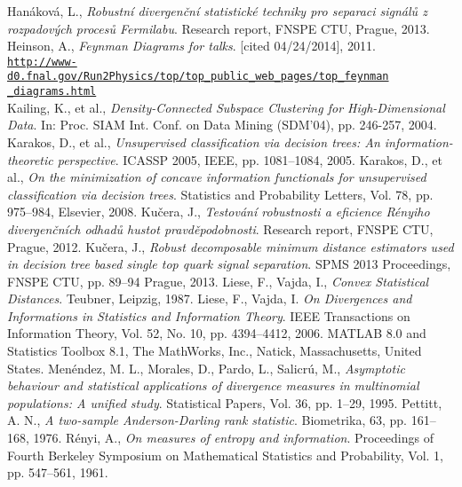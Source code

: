 \begin{thebibliography}{10}
  Han\'akov\'a, L., {\em Robustn\'i divergen\v{c}n\'i statistick\'e techniky pro separaci sign\'al\r{u} z rozpadov\'ych proces\r{u} Fermilabu}. Research report, FNSPE CTU, Prague, 2013.
Heinson, A., {\em Feynman Diagrams for talks}. [cited 04/24/2014], 2011. \\ \href{http://www-d0.fnal.gov/Run2Physics/top/top_public_web_pages/top_feynman_diagrams.html}{\texttt{http://www-d0.fnal.gov/Run2Physics/top/top\_public\_web\_pages/top\_feynman}} \\
\href{http://www-d0.fnal.gov/Run2Physics/top/top_public_web_pages/top_feynman_diagrams.html}{\texttt{\_diagrams.html}}\\
 Kailing, K., et al., {\em Density-Connected Subspace Clustering for High-Dimensional Data}. In: Proc. SIAM Int. Conf. on Data Mining (SDM'04), pp. 246-257, 2004.
 Karakos, D., et al., {\em Unsupervised classification via decision trees: An information-theoretic perspective}. ICASSP 2005, IEEE, pp. 1081--1084, 2005.
 Karakos, D., et al., {\em On the minimization of concave information functionals for unsupervised classification via decision trees}. Statistics and Probability Letters, Vol. 78, pp. 975--984,  Elsevier, 2008.
Ku\v cera, J., {\em Testov\' an\'i robustnosti a eficience R\' enyiho divergen\v cn\' ich odhad\r u hustot pravd\v epodobnosti}. Research report, FNSPE CTU, Prague, 2012.
Ku\v cera, J., {\em Robust \ren decomposable minimum distance estimators used in decision tree based single top quark  signal separation}. SPMS 2013 Proceedings, FNSPE CTU, pp. 89--94 Prague, 2013.
Liese, F., Vajda, I., {\em Convex Statistical Distances}. Teubner, Leipzig, 1987.
Liese, F., Vajda, I. {\em On Divergences and Informations in Statistics and Information Theory}. IEEE Transactions on Information Theory, Vol. 52, No. 10, pp. 4394--4412, 2006.
 MATLAB 8.0 and Statistics Toolbox 8.1, The MathWorks, Inc., Natick, Massachusetts, United States.
 Men\'endez, M. L., Morales, D., Pardo, L., Salicr\'u, M., {\em Asymptotic behaviour and statistical applications of divergence measures in multinomial populations: A unified study}. Statistical Papers, Vol. 36, pp. 1--29, 1995.
Pettitt, A. N., {\em A two-sample Anderson-Darling rank statistic}. Biometrika, 63, pp. 161--168, 1976.
 R\'enyi, A., {\em On measures of entropy and information}. Proceedings of Fourth Berkeley Symposium on Mathematical Statistics and Probability, Vol. 1, pp. 547--561, 1961.

\end{thebibliography}

